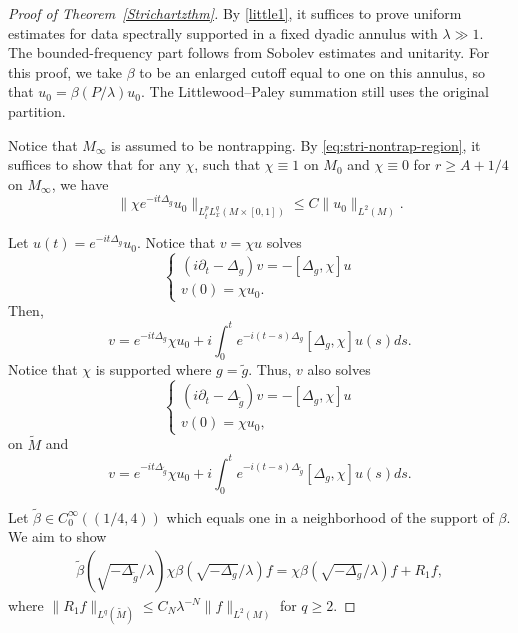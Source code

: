 \documentclass[11pt]{amsart}
\newcommand{\la}{\lambda}
\begin{document}
\begin{proof}[Proof of Theorem~\ref{Strichartzthm}]
By \eqref{little1}, it suffices to prove uniform estimates for data spectrally supported in a fixed dyadic annulus with $\la\gg1$. The bounded-frequency part follows from Sobolev estimates and unitarity. For this proof, we take $\beta$ to be an enlarged cutoff equal to one on this annulus, so that $u_0=\beta(P/\la)u_0$. The Littlewood--Paley summation still uses the original partition.

Notice that $M_\infty$ is assumed to be nontrapping.
By \eqref{eq:stri-nontrap-region}, it suffices to show that for any $\chi$, such that $\chi\equiv 1$ on $M_0$ and $\chi\equiv 0$ for $r\geq A+1/4$ on $M_\infty$, we have
    \begin{equation*}
        \|\chi e^{-it\Delta_g}u_0\|_{L^p_tL^q_x(M\times [0,1])}\leq C \|u_0\|_{L^2(M)}.
    \end{equation*}
    
 Let $u(t)=e^{-it\Delta_g}u_0$.
Notice that $v=\chi u$ solves \begin{equation*}
        \begin{cases}
            (i\partial_t-\Delta_{g})v=-[\Delta_g,\chi]u\\
            v(0)=\chi u_0.
        \end{cases}
    \end{equation*}
Then, \begin{equation*}
        v=e^{-it\Delta_{g}}\chi u_0+i\int^{t}_0e^{-i(t-s)\Delta_{g}}[\Delta_g,\chi]u(s) ds.
    \end{equation*}
    Notice that $\chi$ is supported where $g=\tilde g$. Thus, $v$ also solves \begin{equation*}
        \begin{cases}
            (i\partial_t-\Delta_{\tilde g})v=-[\Delta_g,\chi]u\\
            v(0)=\chi u_0,
        \end{cases}
    \end{equation*}  on $\tilde M$ and \begin{equation*}
        v=e^{-it\Delta_{\tilde g}}\chi u_0+i\int^{t}_0e^{-i(t-s)\Delta_{\tilde g}}[\Delta_g,\chi]u(s) ds.
    \end{equation*}
    
Let $\tilde \beta \in C^\infty_0((1/4,4))$ which equals one in a neighborhood of the support of $\beta$.
We aim to show 
\begin{align}\label{tailpart}
    \tilde\beta(\sqrt{-\Delta_{\tilde g}}/\la) \chi
\beta(\sqrt{-\Delta_{g}}/\la)f=\chi
\beta(\sqrt{-\Delta_{g}}/\la)f+R_1f,
\end{align}
where $\|R_1f\|_{L^q(\tilde M)}\le C_N\la^{-N}\|f\|_{L^2(M)}$  for $q\ge2$. 


\end{proof}
\end{document}
